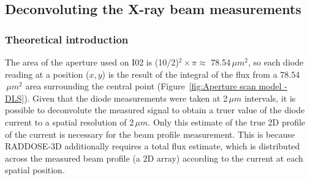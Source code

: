 \subsection{Deconvoluting the X-ray beam measurements}
\label{sub:Deconvolving the X-ray beam measurements}

\subsubsection{Theoretical introduction}
\label{subs:Theoretical introduction}
The area of the aperture used on I02 is (10/2)$^2 \times \pi \approx$ 78.54$\,\mu m^2$, so each diode reading at a position ($x, y$) is the result of the integral of the flux from a 78.54$\,\mu m^2$ area surrounding the central point (Figure~\ref{fig:Aperture scan model - DLS}).
Given that the diode measurements were taken at 2$\,\mu m$ intervals, it is possible to deconvolute the measured signal to obtain a truer value of the diode current to a spatial resolution of 2$\,\mu m$.
Only this estimate of the true 2D profile of the current is necessary for the beam profile measurement. This is because RADDOSE-3D additionally requires a total flux estimate, which is distributed across the measured beam profile (a 2D array) according to the current at each spatial position.
